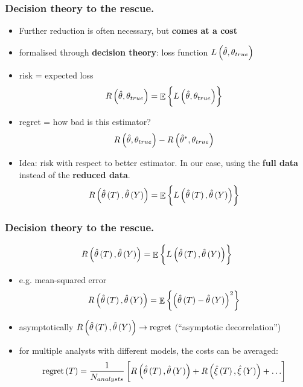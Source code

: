 \documentclass[10pt, compress]{beamer}
\DeclareMathOperator{\E}{\mathbb{E}}
\newcommand{\that}{\hat{\theta}}
\begin{document}
\begin{frame}[fragile]
    \frametitle{Decision theory to the rescue.}
    \begin{itemize}
        \item Further reduction is often necessary, but \textbf{comes at a cost}
        \item formalised through \textbf{decision theory}: loss function $L\del{ \hat{\theta}, \theta_{true}}$
        \item risk = expected loss 
            \[ 
                R\del{\hat{\theta},\theta_{true}} = \E{\cbr{L\del{ \hat{\theta}, \theta_{true}}}}
            \]
        \item regret = how bad is this estimator?
            \[
                R\del{\hat{\theta},\theta_{true}} - R\del{\hat{\theta}^*,\theta_{true}}
            \]
        \item Idea: risk with respect to better estimator. In our case, using the \textbf{full data} instead of the \textbf{reduced data}.
                \[
                    R\del{\that\del{T},\that\del{Y}} = \E{\cbr{L\del{ \that\del{T},\that\del{Y} }}}
                \]
    \end{itemize}
\end{frame}
\begin{frame}[fragile]
    \frametitle{Decision theory to the rescue.}
        \[
                R\del{\that\del{T},\that\del{Y}} = \E{\cbr{L\del{ \that\del{T},\that\del{Y} }}}
        \]
    \begin{itemize}
        \item e.g. mean-squared error
            \[
            R\del{\that\del{T},\that\del{Y}} = \E{\cbr{ \del{ \that\del{T}-\that\del{Y} }^2 }} 
            \]
        \item asymptotically $R\del{\that\del{T},\that\del{Y}} \rightarrow \mathrm{regret}$ (“asymptotic decorrelation”)
        \item for multiple analysts with different models, the costs can be averaged:
            \[
                \mathrm{regret}\del{T} = \frac{1}{N_{analysts}}\sbr{R\del{\that\del{T},\that\del{Y}}+R\del{\hat{\xi}\del{T},\hat{\xi}\del{Y}}+\ldots}
            \]
    \end{itemize}
\end{frame}
\end{document}
